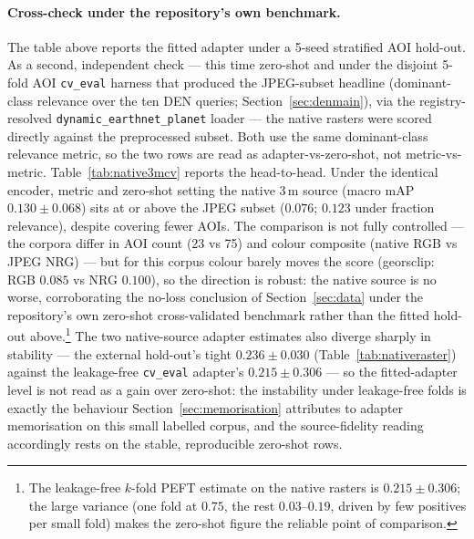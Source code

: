 \documentclass{article}
\begin{document}
\begin{appendices}
\paragraph{Cross-check under the repository's own benchmark.}
The table above reports the fitted adapter under a 5-seed stratified AOI hold-out.
As a second, independent check --- this time zero-shot and under the
disjoint 5-fold AOI \texttt{cv\_eval} harness that produced the JPEG-subset
headline (dominant-class relevance over the ten DEN queries;
Section~\ref{sec:denmain}), via the registry-resolved
\texttt{dynamic\_earthnet\_planet} loader --- the native rasters were scored
directly against the preprocessed subset. Both use the same dominant-class
relevance metric, so the two rows are read as adapter-vs-zero-shot, not
metric-vs-metric. Table~\ref{tab:native3mcv} reports the head-to-head. Under the
identical encoder, metric and zero-shot setting the native 3\,m source (macro mAP
$0.130\pm0.068$) sits at or above the JPEG subset ($0.076$; $0.123$ under
fraction relevance), despite covering fewer AOIs. The comparison is not fully
controlled --- the corpora differ in AOI count (23 vs 75) and colour composite
(native RGB vs JPEG NRG) --- but for this corpus colour barely moves the score
(georsclip: RGB $0.085$ vs NRG $0.100$), so the direction is robust: the native
source is no worse, corroborating the no-loss conclusion of
Section~\ref{sec:data} under the repository's own zero-shot cross-validated
benchmark rather than the fitted hold-out above.\footnote{The
leakage-free $k$-fold PEFT estimate on the native rasters is $0.215\pm0.306$; the
large variance (one fold at $0.75$, the rest $0.03$--$0.19$, driven by few positives
per small fold) makes the zero-shot figure the reliable point of comparison.}
The two native-source adapter estimates also diverge sharply in stability --- the
external hold-out's tight $0.236\pm0.030$ (Table~\ref{tab:nativeraster}) against the
leakage-free \texttt{cv\_eval} adapter's $0.215\pm0.306$ --- so the fitted-adapter
level is not read as a gain over zero-shot: the instability under leakage-free folds
is exactly the behaviour Section~\ref{sec:memorisation} attributes to adapter
memorisation on this small labelled corpus, and the source-fidelity reading
accordingly rests on the stable, reproducible zero-shot rows.


\end{appendices}
\end{document}
